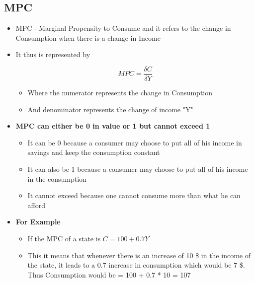 \documentclass[11pt]{article}
\begin{document}
\subsection{MPC}
\label{sec:orge3fc00b}
\begin{itemize}
\item MPC - Marginal Propensity to Consume and it refers to the change in Consumption when there is a change in Income
\item It thus is represented by

$$
  MPC = \frac{\delta C}{\delta Y}
  $$

\begin{itemize}
\item Where the numerator represents the change in Consumption

\item And denominator represents the change of income "Y"
\end{itemize}
\item \textbf{MPC can either be 0 in value or 1 but cannot exceed 1}
\begin{itemize}
\item It can be 0 because a consumer may choose to put all of his income in savings and keep the consumption constant

\item It can also be 1 because a consumer may choose to put all of his income in the consumption

\item It cannot exceed because one cannot consume more than what he can afford
\end{itemize}
\item \textbf{For Example}
\begin{itemize}
\item If the MPC of a state is \(C = 100 + 0.7Y\)

\item This it means that whenever there is an increase of 10 \$ in the income of the state, it leads to a 0.7 increase in consumption which would be 7 \$. Thus Consumption would be =  100 + 0.7 * 10 = 107
\end{itemize}
\end{itemize}
\end{document}
